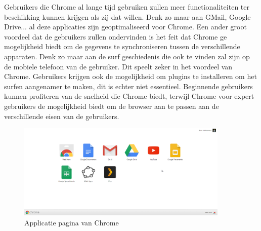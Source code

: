 \documentclass[12pt]{article}
\begin{document}
\newline
Gebruikers die Chrome al lange tijd gebruiken zullen meer functionaliteiten ter beschikking kunnen krijgen als zij dat willen. Denk zo maar aan GMail, Google Drive... al deze applicaties zijn geoptimaliseerd voor Chrome. Een ander groot voordeel dat de gebruikers zullen ondervinden is het feit dat Chrome ge mogelijkheid biedt om de gegevens te synchroniseren tussen de verschillende apparaten. Denk zo maar aan de surf geschiedenis die ook te vinden zal zijn op de mobiele telefoon van de gebruiker. Dit speelt zeker in het voordeel van Chrome. Gebruikers krijgen ook de mogelijkheid om plugins te installeren om het surfen aangenamer te maken, dit is echter niet essentieel. Beginnende gebruikers kunnen profiteren van de snelheid die Chrome biedt, terwijl Chrome voor expert gebruikers de mogelijkheid biedt om de browser aan te passen aan de verschillende eisen van de gebruikers.
\begin{figure}
  \centering
    \includegraphics[width=0.9\textwidth]{apps.png}
  \caption{Applicatie pagina van Chrome}
  \label{fig:apps}
\end{figure}
\newpage
\end{document}
